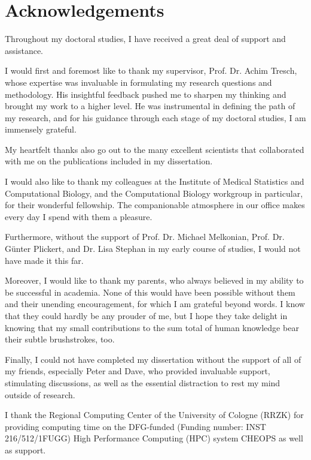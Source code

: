 \chapter*{Acknowledgements}

Throughout my doctoral studies, I have received a great deal of support and
assistance.

\bigbreak
\noindent I would first and foremost like to thank my supervisor, Prof. Dr.
Achim Tresch, whose expertise was invaluable in formulating my research
questions and methodology. His insightful feedback pushed me to sharpen my
thinking and brought my work to a higher level. He was instrumental in
defining the path of my research, and for his guidance through each stage of
my doctoral studies, I am immensely grateful.

\bigbreak
\noindent My heartfelt thanks also go out to the many excellent scientists
that collaborated with me on the publications included in my dissertation.

\bigbreak
\noindent I would also like to thank my colleagues at the Institute of Medical
Statistics and Computational Biology, and the Computational Biology workgroup
in particular, for their wonderful fellowship. The companionable atmosphere in
our office makes every day I spend with them a pleasure.

\bigbreak
\noindent Furthermore, without the support of Prof. Dr. Michael Melkonian,
Prof. Dr. Günter Plickert, and Dr. Lisa Stephan in my early course of
studies, I would not have made it this far.

\bigbreak
\noindent Moreover, I would like to thank my parents, who always believed in
my ability to be successful in academia. None of this would have been possible
without them and their unending encouragement, for which I am grateful beyond
words. I know that they could hardly be any prouder of me, but I hope they
take delight in knowing that my small contributions to the sum total of human
knowledge bear their subtle brushstrokes, too.

\bigbreak
\noindent Finally, I could not have completed my dissertation without the
support of all of my friends, especially Peter and Dave, who provided
invaluable support, stimulating discussions, as well as the essential
distraction to rest my mind outside of research.


\newpage\null\vfill
{}
\noindent I thank the Regional Computing Center of the University of Cologne
(RRZK) for providing computing time on the DFG-funded (Funding number: INST
216\thinspace{}/\thinspace{}512\thinspace{}/\thinspace{}1FUGG) High
Performance Computing (HPC) system CHEOPS as well as support.
\vfill